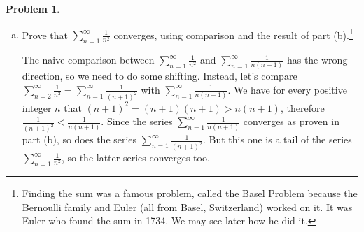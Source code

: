 \documentclass[11pt,oneside]{amsart}
\theoremstyle{definition}
\newtheorem{problem}{Problem}
\theoremstyle{plain}
\begin{document}
\begin{problem}
\begin{enumerate}[(a)]
\begin{solution}
          As to the how the proof might go: no spoilers! (Spoiler in the solution to the next problem set.) I'll just say that maybe the series $1-\frac 12+\frac 13-\frac 14+\cdots$ might be involved in some way. Any reasonable and logical guess is acceptable for this part.
        \end{solution}
  \item Prove that $\displaystyle\sum_{n=1}^\infty \frac 1{n^2}$ converges, using comparison and the result of part (b).\footnote{Finding the sum was a famous problem, called the
          Basel Problem because the Bernoulli family and Euler (all from Basel, Switzerland) worked
          on it. It was Euler who found the sum in 1734. We may see later how he did it.}
          \begin{solution}
            The naive comparison between $\sum_{n=1}^\infty \frac 1{n^2}$ and $\sum_{n=1}^\infty \frac 1{n(n+1)}$ has the wrong direction, so we need to do some shifting. Instead, let's compare $\sum_{n=2}^\infty \frac 1{n^2}=\sum_{n=1}^\infty\frac 1{(n+1)^2}$ with $\sum_{n=1}^\infty \frac 1{n(n+1)}$. We have for every positive integer $n$ that $(n+1)^2=(n+1)(n+1)>n(n+1)$, therefore $\frac 1{(n+1)^2}<\frac 1{n(n+1)}$. Since the series $\sum_{n=1}^\infty \frac 1{n(n+1)}$ converges as proven in part (b), so does the series $\sum_{n=1}^\infty\frac 1{(n+1)^2}$. But this one is a tail of the series $\sum_{n=1}^\infty\frac 1{n^2}$, so the latter series converges too.
          \end{solution}
\end{enumerate}
\end{problem}
\end{document}

